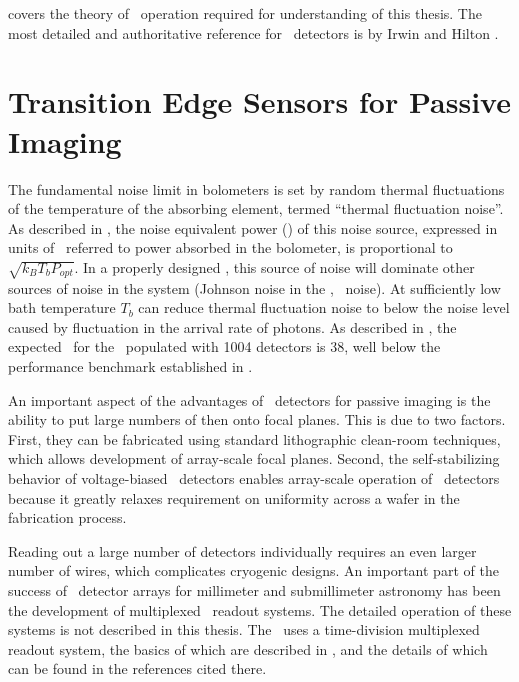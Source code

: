  covers the theory of \TES\ operation required for understanding of this thesis.
The most detailed and authoritative reference for \TES\ detectors is by Irwin and Hilton \cite{irwin_transition-edge_2005}.

\section{Transition Edge Sensors for Passive Imaging} \label{sec:ch2-tes-passive}

The fundamental noise limit in bolometers is set by random thermal fluctuations of the temperature of the absorbing element, termed ``thermal fluctuation noise''.
As described in , the noise equivalent power (\NEP) of this noise source, expressed in units of \pnoise\ referred to power absorbed in the bolometer, is proportional to $\sqrt{k_B T_b P_{opt}}$.
In a properly designed \TES, this source of noise will dominate other sources of noise in the system (Johnson noise in the \TES, \SQUID\ noise).
At sufficiently low bath temperature $T_b$ can reduce thermal fluctuation noise to below the noise level caused by fluctuation in the arrival rate of photons.
As described in , the expected \NETD\ for the \Imager\ populated with 1004 detectors is \SI{38}{\mK}, well below the performance benchmark established in .

An important aspect of the advantages of \TES\ detectors for passive imaging is the ability to put large numbers of then onto focal planes.
This is due to two factors.
First, they can be fabricated using standard lithographic clean-room techniques, which allows development of array-scale focal planes.
Second, the self-stabilizing behavior of voltage-biased \TES\ detectors enables array-scale operation of \TES\ detectors because it greatly relaxes requirement on uniformity across a wafer in the fabrication process.

Reading out a large number of detectors individually requires an even larger number of wires, which complicates cryogenic designs.
An important part of the success of \TES\ detector arrays for millimeter and submillimeter astronomy has been the development of multiplexed \SQUID\ readout systems.
The detailed operation of these systems is not described in this thesis.
The \Imager\ uses a time-division multiplexed readout system, the basics of which are described in , and the details of which can be found in the references cited there.
 


